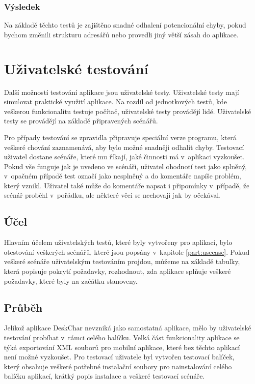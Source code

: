 \documentclass[thesis=B,czech]{resources/FITthesis}[2012/06/26]
\begin{document}
			\subsubsection*{Výsledek}
Na základě těchto testů je zajištěno snadné odhalení potencionální chyby, pokud bychom změnili strukturu adresářů nebo provedli jiný větší zásah do aplikace.

\section{Uživatelské testování}
Další možností testování aplikace jsou uživatelské testy. Uživatelské testy mají simulovat praktické využití aplikace. Na rozdíl od jednotkových testů, kde veškerou funkcionalitu testuje počítač, uživatelské testy provádějí lidé. Uživatelské testy se provádějí na základě připravených scénářů. \par

Pro případy testování se zpravidla připravuje speciální verze programu, která veškeré chování zaznamenává, aby bylo možné snadněji odhalit chyby. Testovací uživatel dostane scénáře, které mu říkají, jaké činnosti má v~aplikaci vyzkoušet. Pokud vše funguje jak je uvedeno ve scénáři, uživatel ohodnotí test jako splněný, v~opačném případě test označí jako nesplněný a do komentáře napíše problém, který vznikl. Uživatel také může do komentáře napsat i připomínky v~případě, že scénář proběhl v~pořádku, ale některé věci se nechovají jak by očekával. 

\subsection{Účel}
Hlavním účelem uživatelských testů, které byly vytvořeny pro aplikaci, bylo otestování veškerých scénářů, které jsou popsány v~kapitole \ref{part:usecase}. Pokud veškeré scénáře uživatelským testováním projdou, můžeme na základě tabulky, která popisuje pokrytí požadavky, rozhodnout, zda aplikace splňuje veškeré požadavky, které byly na začátku stanoveny. 

\subsection{Průběh}
Jelikož aplikace DeskChar nevzniká jako samostatná aplikace, mělo by uživatelské testování probíhat v~rámci celého balíčku. Velká část funkcionality aplikace se týká exportování XML souborů pro mobilní aplikace, které bez těchto aplikací není možné vyzkoušet. Pro testovací uživatele byl vytvořen testovací balíček, který obsahuje veškeré potřebné instalační soubory pro nainstalování celého balíčku aplikací, krátký popis instalace a veškeré testovací scénáře. \par
\end{document}
